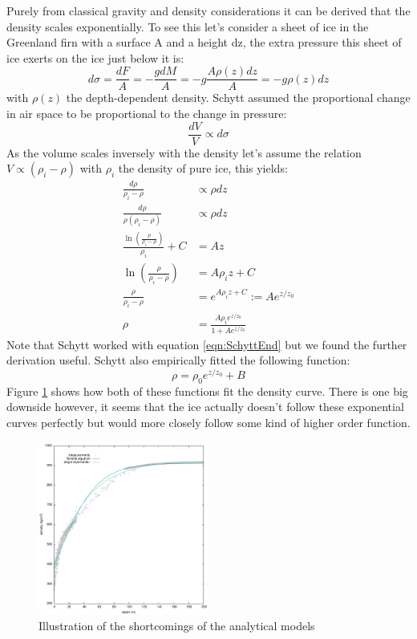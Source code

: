 \documentclass[11pt,a4paper,faculty=we,language=en,doctype=report]{cls/ugent-doc}
\begin{document}
Purely from classical gravity and density considerations it can be derived that
the density scales exponentially. To see this let's consider a sheet of ice in
the Greenland firn with a surface A and a height dz, the extra pressure this
sheet of ice exerts on the ice just below it is:
\begin{equation}
	d\sigma = \frac{dF}{A} = -\frac{gdM}{A} = -g\frac{A\rho(z)dz}{A} = -g\rho(z)dz
\end{equation}
with $\rho(z)$ the depth-dependent density. Schytt assumed the
proportional change in air space to be proportional to the change in
pressure:
\begin{equation}
	\frac{dV}{V} \propto d\sigma
\end{equation}
As the volume scales inversely with the density let's assume the relation $V \propto (\rho_i - \rho)$ with
$\rho_i$ the density of pure ice, this yields\cite{herron_langway_1980}:
\begin{align}
	\frac{d\rho}{\rho_i - \rho} &\propto \rho dz\\
	\frac{d\rho}{\rho(\rho_i - \rho)} &\propto \rho dz \label{eqn:SchyttEnd}\\
	\frac{\ln\left(\frac{\rho}{\rho_i-\rho}\right)}{\rho_i} + C &= Az\\
	\ln\left(\frac{\rho}{\rho_i-\rho}\right) &= A\rho_iz + C\\
	\frac{\rho}{\rho_i-\rho} &= e^{A\rho_iz + C} := Ae^{z/z_0}\\
	\rho &= \frac{A\rho_i e^{z/z_0}}{1 + Ae^{z/z_0}}
\end{align}
Note that Schytt worked with equation \ref{eqn:SchyttEnd} but we found
the further derivation useful. Schytt also empirically fitted the
following function:
\begin{equation}
	\label{eqn:myderiexp}
	\rho = \rho_0 e^{z/z_0} + B
\end{equation}
Figure \ref{fig:DensityMeasurements} shows how both of these
functions fit the density curve.  There is one big downside however,
it seems that the ice actually doesn't follow these exponential
curves perfectly but would more closely follow some kind of higher
order function.
\begin{figure}
  \centering
	\includegraphics[width=0.5\textwidth]{Density_measurements2.pdf}
	\caption{Illustration of the shortcomings of the analytical models}
	\label{fig:DensityMeasurements}
\end{figure}
\end{document}
